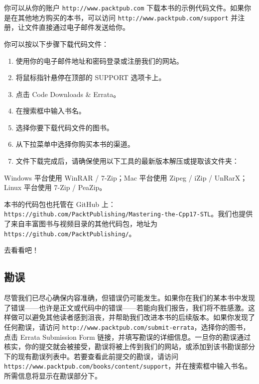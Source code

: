 你可以从你的账户 \texttt{http:/\allowbreak{}/\allowbreak{}www.\allowbreak{}packtpub.\allowbreak{}com} 下载本书的示例代码文件。如果你是在其他地方购买的本书，可以访问 \texttt{http:/\allowbreak{}/\allowbreak{}www.\allowbreak{}packtpub.\allowbreak{}com/\allowbreak{}support} 并注册，让文件直接通过电子邮件发送给你。

你可以按以下步骤下载代码文件：

\begin{enumerate}
\item 使用你的电子邮件地址和密码登录或注册我们的网站。
\item 将鼠标指针悬停在顶部的 SUPPORT 选项卡上。
\item 点击 Code Downloads \& Errata。
\item 在搜索框中输入书名。
\item 选择你要下载代码文件的图书。
\item 从下拉菜单中选择你购买本书的渠道。
\item 文件下载完成后，请确保使用以下工具的最新版本解压或提取该文件夹：
\end{enumerate}

Windows 平台使用 WinRAR / 7-Zip；Mac 平台使用 Zipeg / iZip / UnRarX；Linux 平台使用 7-Zip / PeaZip。

本书的代码包也托管在 GitHub 上：\texttt{https:/\allowbreak{}/\allowbreak{}github.\allowbreak{}com/\allowbreak{}Packt\allowbreak{}Publishing/\allowbreak{}Mastering-the-Cpp17-STL}。我们也提供了来自丰富图书与视频目录的其他代码包，地址为 \texttt{https:/\allowbreak{}/\allowbreak{}github.\allowbreak{}com/\allowbreak{}Packt\allowbreak{}Publishing/\allowbreak{}}。

去看看吧！

\subsection{勘误}

尽管我们已尽心确保内容准确，但错误仍可能发生。如果你在我们的某本书中发现了错误——也许是正文或代码中的错误——若能向我们报告，我们将不胜感激。这样做可以避免其他读者感到沮丧，并帮助我们改进本书的后续版本。如果你发现了任何勘误，请访问 \texttt{http:/\allowbreak{}/\allowbreak{}www.\allowbreak{}packtpub.\allowbreak{}com/\allowbreak{}submit-errata}，选择你的图书，点击 Errata Submission Form 链接，并填写勘误的详细信息。一旦你的勘误通过核实，你的提交就会被接受，勘误将被上传到我们的网站，或添加到该书勘误部分下的现有勘误列表中。若要查看此前提交的勘误，请访问 \texttt{https:/\allowbreak{}/\allowbreak{}www.\allowbreak{}packtpub.\allowbreak{}com/\allowbreak{}books/\allowbreak{}content/\allowbreak{}support}，并在搜索框中输入书名。所需信息将显示在勘误部分下。

